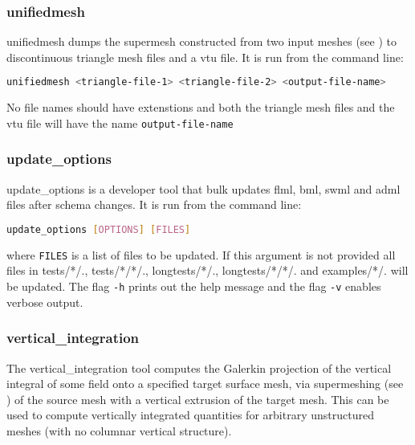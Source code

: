 \subsubsection{unifiedmesh}
\label{sec:unifiedmesh}
unifiedmesh dumps the supermesh constructed from two input meshes (see \citet{farrell2009a,farrell2010a}) to discontinuous triangle mesh files and a vtu file. It is run from the command line:
\begin{lstlisting}[language = Bash]
unifiedmesh <triangle-file-1> <triangle-file-2> <output-file-name>
\end{lstlisting} 
No file names should have extenstions and both the triangle mesh files and the vtu file will have the name \lstinline[language = Bash]+output-file-name+


\subsubsection{update\_options}
\label{sec:update_options}
update\_options is a developer tool that bulk updates flml, bml, swml and adml files after schema changes. It is run from the command line:
\begin{lstlisting}[language = Bash]
update_options [OPTIONS] [FILES]
\end{lstlisting} 
where \lstinline+FILES+ is a list of files to be updated. If this argument is not provided all files in tests/*/., tests/*/*/., longtests/*/., longtests/*/*/. and examples/*/. will be updated.
The flag \lstinline[language = Bash]+-h+ prints out the help message and the flag \lstinline[language = Bash]+-v+ enables verbose output.


\subsubsection{vertical\_integration}
\label{sec:vertical_integration}

The vertical\_integration tool computes the Galerkin projection of the vertical
integral of some field onto a specified target surface mesh, via supermeshing (see \citet{farrell2009a,farrell2010a})
of the source mesh with a vertical extrusion of the target mesh. This can be used to
compute vertically integrated quantities for arbitrary unstructured meshes (with
no columnar vertical structure).

